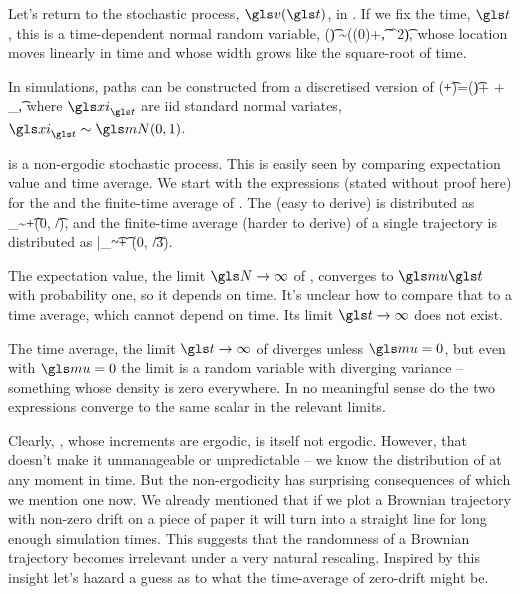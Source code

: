Let's return to the stochastic process, $\gv(\t)$, in . If we fix the time, $\t$, this is a time-dependent normal random variable,
\be
\gv(\t) \sim \mN(\gv(0)+\gmu\t, \gsigma^2\t),
\ee
whose location moves linearly in time and whose width grows like the square-root of time. 

In simulations, \BM paths can be constructed from a discretised version of 
\be
\gv(\t+\dt)=\gv(\t)+ \gmu \dt + \gsigma \sqrt{\dt} \gxi_\t,
\ee
where $\gxi_\t$ are iid standard normal variates, $\gxi_\t\sim\mN(0,1)$.

\BM is a non-ergodic stochastic process. This is easily seen by comparing expectation value and time average. We start with the expressions (stated without proof here) for the \FEA and the finite-time average of \BM. The \FEA (easy to derive) is distributed as
\be
\ave{\gv(\t)}_\N \sim \gmu \t+\mN(0, \t/\N),
\ee
and the finite-time average (harder to derive) of a single \BM trajectory is distributed as
\be
\bar{\gv}_\t \sim \gmu \t + \gsigma \mN(0, \t/3).
\ee

The expectation value, \ie the limit $\N\to\infty$ of , converges to $\gmu \t$ with probability  one, so it depends on time. It's unclear how to compare that to a time average, which cannot depend on time. Its limit $\t\to\infty$ does not exist.

The time average, the limit $\t\to\infty $ of  diverges unless $\gmu=0$, but even with $\gmu=0$ the limit is a random variable with diverging variance -- something whose density 
is zero everywhere. In no meaningful sense do the two expressions converge to the same scalar in the relevant limits.

Clearly, \BM, whose increments are ergodic, is itself not ergodic. However, that doesn't make it unmanageable or unpredictable -- we know the distribution of \BM at any moment in time. But the non-ergodicity has surprising consequences of which we mention one now. We already mentioned that if we plot a Brownian trajectory with non-zero drift on a piece of paper it will turn into a straight line for long enough simulation times. This suggests that the randomness of a Brownian trajectory becomes irrelevant under a very natural rescaling. Inspired by this insight let's hazard a guess as to what the time-average of zero-drift \BM might be. 

